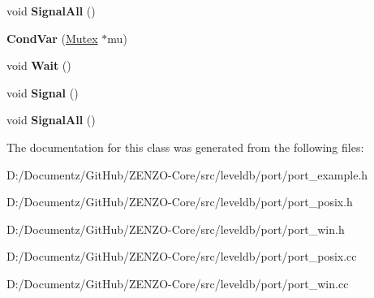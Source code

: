 \begin{DoxyCompactItemize}
void {\bfseries Signal\+All} ()
\item 
\mbox{\label{classleveldb_1_1port_1_1_cond_var_abb23c74c7b58298a20d4cfd6a0c5839a}} 
{\bfseries Cond\+Var} (\mbox{\hyperlink{classleveldb_1_1port_1_1_mutex}{Mutex}} $\ast$mu)
\item 
\mbox{\label{classleveldb_1_1port_1_1_cond_var_a9e9855595a3f3a3ccf47949696065597}} 
void {\bfseries Wait} ()
\item 
\mbox{\label{classleveldb_1_1port_1_1_cond_var_ac36a2038b058b24886741c99e4a7d7d4}} 
void {\bfseries Signal} ()
\item 
\mbox{\label{classleveldb_1_1port_1_1_cond_var_ad7725662f3c1bc542100c41081d1428a}} 
void {\bfseries Signal\+All} ()
\end{DoxyCompactItemize}


The documentation for this class was generated from the following files\+:\begin{DoxyCompactItemize}
\item 
D\+:/\+Documentz/\+Git\+Hub/\+Z\+E\+N\+Z\+O-\/\+Core/src/leveldb/port/port\+\_\+example.\+h\item 
D\+:/\+Documentz/\+Git\+Hub/\+Z\+E\+N\+Z\+O-\/\+Core/src/leveldb/port/port\+\_\+posix.\+h\item 
D\+:/\+Documentz/\+Git\+Hub/\+Z\+E\+N\+Z\+O-\/\+Core/src/leveldb/port/port\+\_\+win.\+h\item 
D\+:/\+Documentz/\+Git\+Hub/\+Z\+E\+N\+Z\+O-\/\+Core/src/leveldb/port/port\+\_\+posix.\+cc\item 
D\+:/\+Documentz/\+Git\+Hub/\+Z\+E\+N\+Z\+O-\/\+Core/src/leveldb/port/port\+\_\+win.\+cc\end{DoxyCompactItemize}
